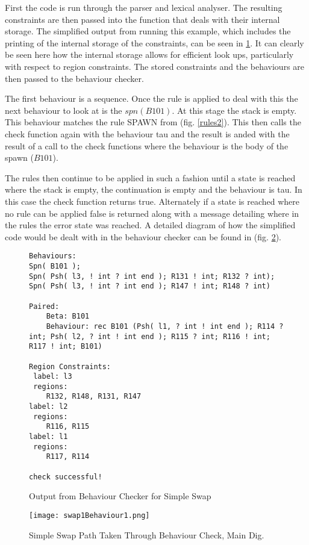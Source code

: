 First the code is run through the parser and lexical analyser. The resulting constraints are then passed into the function that deals with their internal storage. The simplified output from running this example, which includes the printing of the internal storage of the constraints, can be seen in \ref{bOut}. It can clearly be seen here how the internal storage allows for efficient look ups, particularly with respect to region constraints. The stored constraints and the behaviours are then passed to the behaviour checker. 

The first behaviour is a sequence. Once the rule is applied to deal with this the next behaviour to look at is the $spn(B101)$. At this stage the stack is empty. This behaviour matches the rule SPAWN from (fig. \ref{rules2}). This then calls the check function again with the behaviour tau and the result is anded with the result of a call to the check functions where the behaviour is the body of the spawn ($B101$). 

The rules then continue to be applied in such a fashion until a state is reached where the stack is empty, the continuation is empty and the behaviour is tau. In this case the check function returns true. Alternately if a state is reached where no rule can be applied false is returned along with a message detailing where in the rules the error state was reached. A detailed diagram of how the simplified code would be dealt with in the behaviour checker can be found in (fig. \ref{path}).

\begin{figure}
\begin{lstlisting}
Behaviours:
Spn( B101 );
Spn( Psh( l3, ! int ? int end ); R131 ! int; R132 ? int);
Spn( Psh( l3, ! int ? int end ); R147 ! int; R148 ? int)

Paired: 
	Beta: B101 
	Behaviour: rec B101 (Psh( l1, ? int ! int end ); R114 ? int; Psh( l2, ? int ! int end ); R115 ? int; R116 ! int; R117 ! int; B101)

Region Constraints:
 label: l3
 regions:
	R132, R148, R131, R147
label: l2
 regions:
	R116, R115
label: l1
 regions:
	R117, R114

check successful!
\end{lstlisting}
\caption{Output from Behaviour Checker for Simple Swap}
\label{bOut}
\end{figure}

\begin{figure}
\texttt{[image: swap1Behaviour1.png]}
\caption{Simple Swap Path Taken Through Behaviour Check, Main Dig.}
\label{path}
\end{figure}

